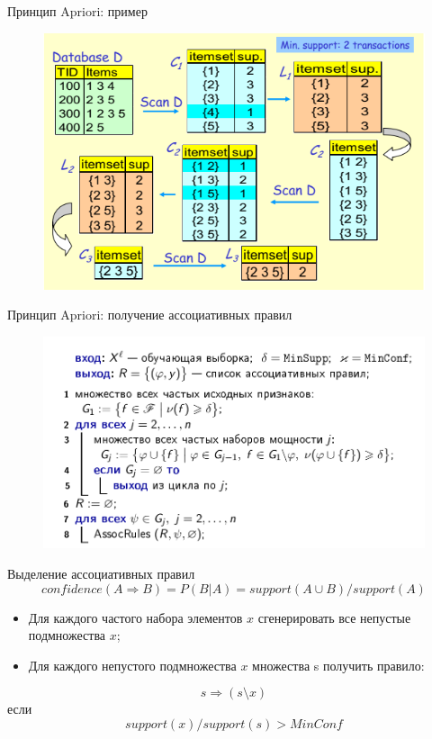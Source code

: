 \documentclass{beamer}
\begin{document}
\begin{frame}{Принцип Apriori: пример}
	\begin{figure}[h]
		\centering
		\includegraphics[scale=0.75]{images/lec08-pic13.png}
	\end{figure}
\end{frame}

\begin{frame}{Принцип Apriori: получение ассоциативных правил}
	\begin{figure}[h]
		\centering
		\includegraphics[scale=0.5]{images/lec08-pic12.png}
	\end{figure}
\end{frame}

\begin{frame}{Выделение ассоциативных правил}
	\[confidence(A\Rightarrow B)= P(B|A) = support(A\cup B)/support(A)\]

	\begin{itemize}
		\item Для каждого частого набора элементов $x$ сгенерировать все непустые подмножества $x$;
		\item Для каждого непустого подмножества $x$ множества s получить правило:
	\end{itemize}
	
	\[s \Rightarrow (s\setminus x)\]
	если
	\[support(x)/support(s) > MinConf\]
\end{frame}
\end{document}
